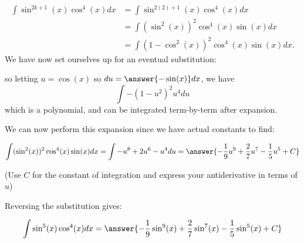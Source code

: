 \documentclass{ximera}
\begin{document}
\begin{exercise}
\begin{exercise}
\begin{align*}
  \int \sin^{2k+1}(x) \cos^4(x) dx &=  \int \sin^{2(2)+1}(x) \cos^4(x) dx \\
  &= \int(\sin^{2}(x))^2 \cos^4(x) \sin(x) dx\\
  &= \int (1-\cos^2(x))^2 \cos^4(x) \sin(x)dx.
\end{align*}
We have now set ourselves up for an eventual substitution:
\begin{center}%
\end{center}
so letting $u = \cos(x)$ so $du =\answer{-\sin(x)} dx$, we have
\[
\int -(1-u^2)^2 u^4 du
\]
which is a polynomial, and can be integrated term-by-term after expansion.  

\begin{exercise}
We can now perform this expansion since we have actual constants to find:

\[  \int(\sin^{2}(x))^2 \cos^4(x) \sin(x) dx = \int -u^8+2u^6-u^4 du =\answer{-\frac{1}{9}u^9+\frac{2}{7}u^7-\frac{1}{5}u^5 +C}\]

(Use $C$ for the constant of integration and express your antiderivative in terms of $u$)
\begin{exercise}

Reversing the substitution gives:

\[
\int \sin^5(x) \cos^4(x) dx=\answer{-\frac{1}{9}\sin^9(x)+\frac{2}{7}\sin^7(x)-\frac{1}{5}\sin^5(x) +C}
\]
\end{exercise}


\end{exercise}
\end{exercise}
\end{exercise}
\end{document}
